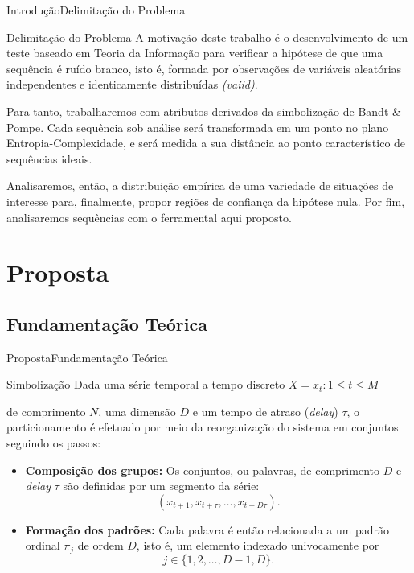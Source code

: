 \documentclass[10pt,xcolor={dvipsnames}]{beamer}
\begin{document}
\begin{frame}{Introdução}{Delimitação do Problema}
\begin{block}{Delimitação do Problema}
A motivação deste trabalho é o desenvolvimento de um teste baseado em Teoria da Informação para verificar a hipótese de que uma sequência é ruído branco, isto é, formada por observações de variáveis aleatórias independentes e identicamente distribuídas \textit{(vaiid)}.
\pause

Para tanto, trabalharemos com atributos derivados da simbolização de Bandt \& Pompe.
Cada sequência sob análise será transformada em um ponto no plano Entropia-Complexidade, e será medida a sua distância ao ponto característico de sequências ideais.
\pause

Analisaremos, então, a distribuição empírica de uma variedade de situações de interesse para, finalmente, propor regiões de confiança da hipótese nula.
Por fim, analisaremos sequências com o ferramental aqui proposto.
\end{block}
\end{frame}

\section{Proposta}
\subsection{Fundamentação Teórica}

\begin{frame}{Proposta}{Fundamentação Teórica}
	\begin{block}{Simbolização}
		Dada uma série temporal a tempo discreto $ X = {x_t:1\leq t\leq M} $
 
		de comprimento $N$, uma dimensão $D$ e um tempo de atraso (\textit{delay}) $\tau$, o particionamento é efetuado por meio da reorganização do sistema em conjuntos seguindo os passos:
\pause
		\begin{itemize}
			\item \textbf{Composição dos grupos:} Os conjuntos, ou palavras, de comprimento $D$ e \textit{delay} $\tau$ são definidas por um segmento da série: $$ (x_{t+1},x_{t+\tau},\ldots, x_{t+D\tau}).$$ 
			\pause
			\item \textbf{Formação dos padrões:} Cada palavra é então relacionada a um padrão ordinal $\pi_j$ de ordem $D$, isto é, um elemento indexado univocamente por $$ j\in\{1, 2,\ldots, D-1, D\}. $$
		\end{itemize}
\end{block}
\end{frame}
\end{document}
